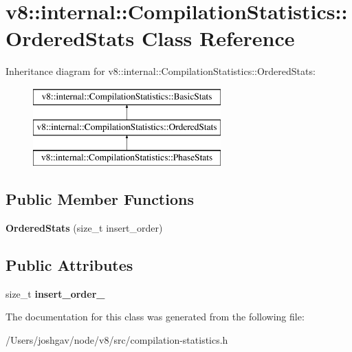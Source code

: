 \hypertarget{classv8_1_1internal_1_1_compilation_statistics_1_1_ordered_stats}{}\section{v8\+:\+:internal\+:\+:Compilation\+Statistics\+:\+:Ordered\+Stats Class Reference}
\label{classv8_1_1internal_1_1_compilation_statistics_1_1_ordered_stats}
Inheritance diagram for v8\+:\+:internal\+:\+:Compilation\+Statistics\+:\+:Ordered\+Stats\+:\begin{figure}[H]
\begin{center}
\leavevmode
\includegraphics[height=3.000000cm]{classv8_1_1internal_1_1_compilation_statistics_1_1_ordered_stats}
\end{center}
\end{figure}
\subsection*{Public Member Functions}
\begin{DoxyCompactItemize}
\item 
{\bfseries Ordered\+Stats} (size\+\_\+t insert\+\_\+order)\hypertarget{classv8_1_1internal_1_1_compilation_statistics_1_1_ordered_stats_a2c0c0eb504475bbc8d313a3df03e9e07}{}\label{classv8_1_1internal_1_1_compilation_statistics_1_1_ordered_stats_a2c0c0eb504475bbc8d313a3df03e9e07}

\end{DoxyCompactItemize}
\subsection*{Public Attributes}
\begin{DoxyCompactItemize}
\item 
size\+\_\+t {\bfseries insert\+\_\+order\+\_\+}\hypertarget{classv8_1_1internal_1_1_compilation_statistics_1_1_ordered_stats_a517322b4a2754f07e73e5e75a66a56c1}{}\label{classv8_1_1internal_1_1_compilation_statistics_1_1_ordered_stats_a517322b4a2754f07e73e5e75a66a56c1}

\end{DoxyCompactItemize}


The documentation for this class was generated from the following file\+:\begin{DoxyCompactItemize}
\item 
/\+Users/joshgav/node/v8/src/compilation-\/statistics.\+h\end{DoxyCompactItemize}
